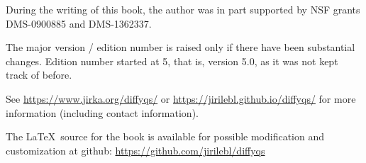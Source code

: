 \documentclass[12pt]{book}
\begin{document}
\begin{small}

\bigskip

\noindent
During the writing of this book, 
the author was in part supported by NSF grants DMS-0900885 and
DMS-1362337.

\bigskip

\noindent
The major version / edition
number is raised only if there have been substantial changes.
Edition
number started at 5, that is, version 5.0, as it was not kept track of
before.

\bigskip

\noindent
See
\url{https://www.jirka.org/diffyqs/}
or
\url{https://jirilebl.github.io/diffyqs/}
for more information
(including contact information).


\bigskip

\noindent
The \LaTeX\ source for the book is available
for possible modification and customization
at github: \url{https://github.com/jirilebl/diffyqs}


\end{small}

\diffytableofcontents

\newpage












\end{document}
